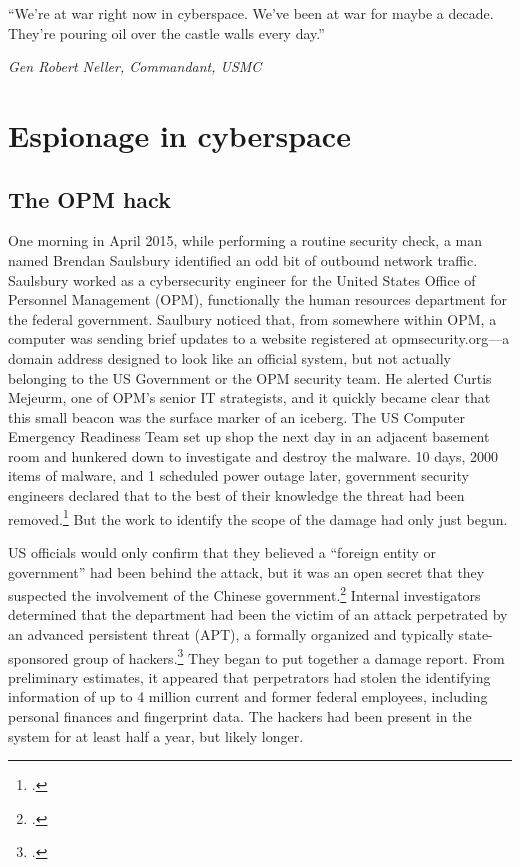 \documentclass{memoir}
\begin{document}
\begin{refsegment}
\epigraph{``We're at war right now in cyberspace. We've been at war for maybe a decade. They're pouring oil over the castle walls every day.''}{\emph{Gen Robert Neller, Commandant, USMC}}

\section{Espionage in cyberspace}
\subsection{The OPM hack}
One morning in April 2015, while performing a routine security check, a man named Brendan Saulsbury identified an odd bit of outbound network traffic. Saulsbury worked as a cybersecurity engineer for the United States Office of Personnel Management (OPM), functionally the human resources department for the federal government. Saulbury noticed that, from somewhere within OPM, a computer was sending brief updates to a website registered at opmsecurity.org---a domain address designed to look like an official system, but not actually belonging to the US Government or the OPM security team. He alerted Curtis Mejeurm, one of OPM's senior IT strategists, and it quickly became clear that this small beacon was the surface marker of an iceberg. The US Computer Emergency Readiness Team set up shop the next day in an adjacent basement room and hunkered down to investigate and destroy the malware. 10 days, 2000 items of malware, and 1 scheduled power outage later, government security engineers declared that to the best of their knowledge the threat had been removed.\footcite{koerner_inside_2016} But the work to identify the scope of the damage had only just begun.

US officials would only confirm that they believed a ``foreign entity or government'' had been behind the attack, but it was an open secret that they suspected the involvement of the Chinese government.\footcite{spetalnick_china_2015} Internal investigators determined that the department had been the victim of an attack perpetrated by an advanced persistent threat (APT), a formally organized and typically state-sponsored group of hackers.\footcite[Attributing a cyberattack is difficult because hackers have endless means to obscure their orgins. In this case, however, the first clue that investigators found was left there on purpose. A particularly effective group of hackers tied to China has made it a calling card of sorts to register sites using the names of members of Marvel's comic book superhero group, The Avengers. In this case, opmsecurity.org was registered under the name ``Steve Rogers,'' better known as Captain America.]{koerner_inside_2016} They began to put together a damage report. From preliminary estimates, it appeared that perpetrators had stolen the identifying information of up to 4 million current and former federal employees, including personal finances and fingerprint data. The hackers had been present in the system for at least half a year, but likely longer.


\end{refsegment}
\end{document}
